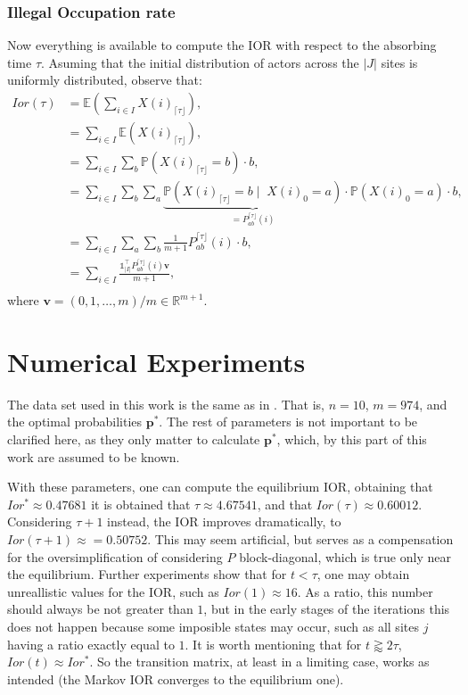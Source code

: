 \documentclass{article}
\newcommand{\pp}{\mathbf{p}}
\newcommand{\p}{\mathds{P}}
\newcommand{\E}{\mathds{E}}
\newcommand{\vv}{\mathbf{v}}
\begin{document}
\subsubsection{Illegal Occupation rate}
Now everything is available to compute the IOR with respect to the absorbing time $\tau$. Asuming that the initial distribution of actors across the $|J|$ sites is uniformly distributed, observe that:
\begin{align*}
	Ior(\tau) 	&= \E\left(\sum\limits_{i \in I} X(i)_{\lceil \tau \rfloor}\right),\\
				&= \sum\limits_{i \in I} \E(X(i)_{\lceil \tau \rfloor}),\\
				&= \sum\limits_{i \in I} \sum\limits_{b} \p(X(i)_{\lceil \tau \rfloor} = b)\cdot b,\\
				&= \sum\limits_{i \in I} \sum\limits_{b}\sum\limits_{a} \underbrace{\p(X(i)_{\lceil \tau \rfloor} = b \; \vert \;\;X(i)_{0} = a)}_{ = P^{{\lceil \tau \rfloor}}_{ab}(i)} \cdot \p(X(i)_0 = a)\cdot b,\\
				&= \sum\limits_{i \in I} \sum\limits_{a}\sum\limits_{b} \frac{1}{m+1}P^{{\lceil \tau \rfloor}}_{ab}(i)\cdot b,\\
				&= \sum\limits_{i \in I} \frac{\mathbb{1}_{|I|}^{\top}P^{{\lceil \tau \rfloor}}_{ab}(i)\vv}{m+1},\\
\end{align*}
where $\vv = (0, 1, \dots, m)/m \in \mathds{R}^{m+1}$.\par

\section{Numerical Experiments}
The data set used in this work is the same as in \citep{Carrasco}. That is, $n=10$, $m = 974$, and the optimal probabilities $\pp^*$. The rest of parameters is not important to be clarified here, as they only matter to calculate $\pp^*$, which, by this part of this work are assumed to be known.\par
With these parameters, one can compute the equilibrium IOR, obtaining that $Ior^* \approx 0.47681$ it is obtained that $\tau \approx 4.67541$, and that $Ior(\tau) \approx 0.60012$. Considering $\tau+1$ instead, the IOR improves dramatically, to $Ior(\tau+1) \approx = 0.50752$. This may seem artificial, but serves as a compensation for the oversimplification of considering $P$ block-diagonal, which is true only near the equilibrium. Further experiments show that for $t < \tau$, one may obtain unreallistic values for the IOR, such as $Ior(1) \approx 16$. As a ratio, this number should always be not greater than $1$, but in the early stages of the iterations this does not happen because some imposible states may occur, such as all sites $j$ having a ratio exactly equal to $1$. It is worth mentioning that for $t \gtrapprox 2\tau$, $Ior(t) \approx Ior^*$. So the transition matrix, at least in a limiting case, works as intended (the Markov IOR converges to the equilibrium one).\par
\end{document}
